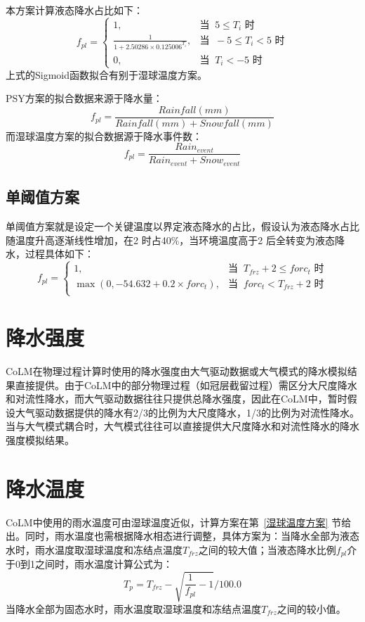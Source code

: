 本方案计算液态降水占比如下：
\begin{equation*}
f_{pl}= \begin{cases}
1, & \text{当 }\ 5\leqslant T_i \text{ 时}\\
\frac{1}{1 + 2.50286\times 0.125006^{T_{i}}}, & \text{当 }\ -5\leqslant T_i < 5 \text{ 时} \\
0, & \text{当 }\ T_i < -5 \text{ 时}
\end{cases}
\end{equation*}
%
上式的Sigmoid函数拟合有别于湿球温度方案。

PSY方案的拟合数据来源于降水量：
\begin{equation}
f_{pl} = \frac{Rainfall(mm)}{Rainfall(mm) + Snowfall(mm)}
\end{equation}
%
而湿球温度方案的拟合数据源于降水事件数：
\begin{equation}
f_{pl} = \frac{Rain_{event}}{Rain_{event} + Snow_{event}}
\end{equation}


\subsection{单阈值方案}
单阈值方案就是设定一个关键温度以界定液态降水的占比，假设认为液态降水占比随温度升高逐渐线性增加，在2 \textcelsius 时占40\%，当环境温度高于2 \textcelsius 后全转变为液态降水，过程具体如下：
\begin{equation*}
f_{pl}= \begin{cases}
1, & \text{当 }\ T_{frz}+2\leqslant forc_t \text{ 时}\\
\max(0,-54.632 + 0.2\times forc_t), & \text{当 }\ forc_t < T_{frz} + 2 \text{ 时} \\
\end{cases}
\end{equation*}


\section{降水强度}
CoLM在物理过程计算时使用的降水强度由大气驱动数据或大气模式的降水模拟结果直接提供。由于CoLM中的部分物理过程（如冠层截留过程）需区分大尺度降水和对流性降水，而大气驱动数据往往只提供总降水强度，因此在CoLM中，暂时假设大气驱动数据提供的降水有2/3的比例为大尺度降水，1/3的比例为对流性降水。当与大气模式耦合时，大气模式往往可以直接提供大尺度降水和对流性降水的降水强度模拟结果。


\section{降水温度}
CoLM中使用的雨水温度可由湿球温度近似，计算方案在第~\ref{湿球温度方案} 节给出。同时，雨水温度也需根据降水相态进行调整，具体方案为：当降水全部为液态水时，雨水温度取湿球温度和冻结点温度$T_{frz}$之间的较大值；当液态降水比例$f_{pl}$介于0到1之间时，雨水温度计算公式为：$$T_p=T_{frz}-\sqrt{\frac{1}{f_{pl}}-1}/100.0$$
当降水全部为固态水时，雨水温度取湿球温度和冻结点温度$T_{frz}$之间的较小值。



